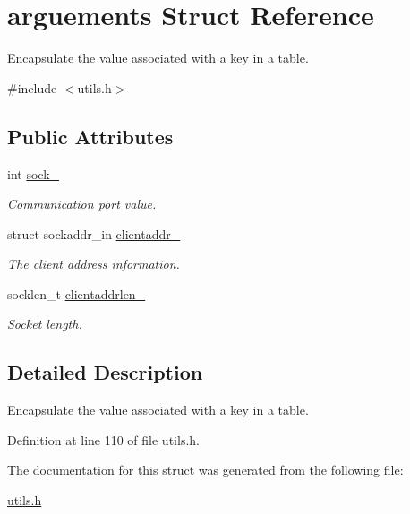 \hypertarget{structarguements}{\section{arguements Struct Reference}
\label{structarguements}
}


Encapsulate the value associated with a key in a table.  




{\ttfamily \#include $<$utils.\-h$>$}

\subsection*{Public Attributes}
\begin{DoxyCompactItemize}
\item 
\hypertarget{structarguements_ae552af3efd6f7ede50ea42f6dee2bae5}{int \hyperlink{structarguements_ae552af3efd6f7ede50ea42f6dee2bae5}{sock\-\_\-}}\label{structarguements_ae552af3efd6f7ede50ea42f6dee2bae5}

\begin{DoxyCompactList}\small\item\em Communication port value. \end{DoxyCompactList}\item 
\hypertarget{structarguements_a13029663821d28fdf4e4135275f1f8e5}{struct sockaddr\-\_\-in \hyperlink{structarguements_a13029663821d28fdf4e4135275f1f8e5}{clientaddr\-\_\-}}\label{structarguements_a13029663821d28fdf4e4135275f1f8e5}

\begin{DoxyCompactList}\small\item\em The client address information. \end{DoxyCompactList}\item 
\hypertarget{structarguements_a15598268260ce183c8f76d23489dca10}{socklen\-\_\-t \hyperlink{structarguements_a15598268260ce183c8f76d23489dca10}{clientaddrlen\-\_\-}}\label{structarguements_a15598268260ce183c8f76d23489dca10}

\begin{DoxyCompactList}\small\item\em Socket length. \end{DoxyCompactList}\end{DoxyCompactItemize}


\subsection{Detailed Description}
Encapsulate the value associated with a key in a table. 

Definition at line 110 of file utils.\-h.



The documentation for this struct was generated from the following file\-:\begin{DoxyCompactItemize}
\item 
\hyperlink{utils_8h}{utils.\-h}\end{DoxyCompactItemize}
